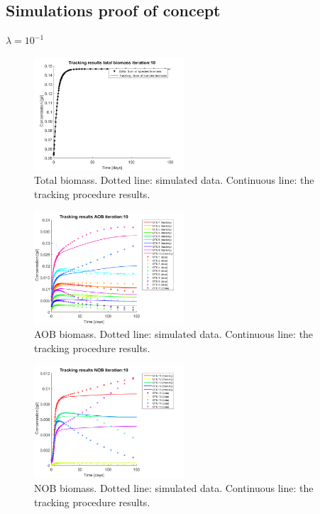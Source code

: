 \documentclass[3p,times]{elsarticle}
\begin{document}
\subsection{Simulations proof of concept}
\textbf{$\lambda = 10^{-1}$}
\begin{figure}[h]
	\centering
	\includegraphics[width=0.5\textwidth]{Synthetic_data//lambda_=_e-1//191210_no_noise_Biomass_iter_10}
	\caption{Total biomass. Dotted line: simulated data. Continuous line: the tracking procedure results.}
	\label{Total Biomass no noise e1}
\end{figure}
\begin{figure}[h]
	\centering
	\includegraphics[width=0.5\textwidth]{Synthetic_data//lambda_=_e-1//191210_no_noise_AOB_iter_10_plot_1}
	\caption{AOB biomass. Dotted line: simulated data. Continuous line: the tracking procedure results.}
	\label{AOB no noise e1}
\end{figure}
\begin{figure}[h]
	\centering
	\includegraphics[width=0.5\textwidth]{Synthetic_data//lambda_=_e-1//191210_no_noise_NOB_iter_10_plot_1}
	\caption{NOB biomass. Dotted line: simulated data. Continuous line: the tracking procedure results.}
	\label{NOB no noise e1}
\end{figure}
\end{document}
